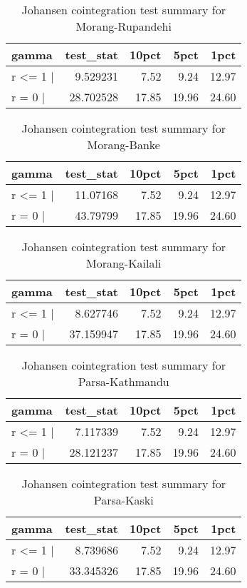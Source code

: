 \documentclass[
  12pt,
]{article}
\begin{document}
\begin{longtable}[t]{lrrrr}
\caption{\label{tab:rice-cajo-test}Johansen cointegration test summary for Morang-Rupandehi}\\
\toprule
gamma & test\_stat & 10pct & 5pct & 1pct\\
\midrule
r <= 1 | & 9.529231 & 7.52 & 9.24 & 12.97\\
r = 0  | & 28.702528 & 17.85 & 19.96 & 24.60\\
\bottomrule
\end{longtable}

\begin{longtable}[t]{lrrrr}
\caption{\label{tab:rice-cajo-test}Johansen cointegration test summary for Morang-Banke}\\
\toprule
gamma & test\_stat & 10pct & 5pct & 1pct\\
\midrule
r <= 1 | & 11.07168 & 7.52 & 9.24 & 12.97\\
r = 0  | & 43.79799 & 17.85 & 19.96 & 24.60\\
\bottomrule
\end{longtable}

\begin{longtable}[t]{lrrrr}
\caption{\label{tab:rice-cajo-test}Johansen cointegration test summary for Morang-Kailali}\\
\toprule
gamma & test\_stat & 10pct & 5pct & 1pct\\
\midrule
r <= 1 | & 8.627746 & 7.52 & 9.24 & 12.97\\
r = 0  | & 37.159947 & 17.85 & 19.96 & 24.60\\
\bottomrule
\end{longtable}

\begin{longtable}[t]{lrrrr}
\caption{\label{tab:rice-cajo-test}Johansen cointegration test summary for Parsa-Kathmandu}\\
\toprule
gamma & test\_stat & 10pct & 5pct & 1pct\\
\midrule
r <= 1 | & 7.117339 & 7.52 & 9.24 & 12.97\\
r = 0  | & 28.121237 & 17.85 & 19.96 & 24.60\\
\bottomrule
\end{longtable}

\begin{longtable}[t]{lrrrr}
\caption{\label{tab:rice-cajo-test}Johansen cointegration test summary for Parsa-Kaski}\\
\toprule
gamma & test\_stat & 10pct & 5pct & 1pct\\
\midrule
r <= 1 | & 8.739686 & 7.52 & 9.24 & 12.97\\
r = 0  | & 33.345326 & 17.85 & 19.96 & 24.60\\
\bottomrule
\end{longtable}
\end{document}
